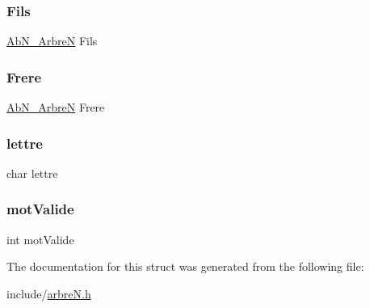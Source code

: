 \subsubsection{\texorpdfstring{Fils}{Fils}}
{\footnotesize\ttfamily \hyperlink{arbre_n_8h_add8f6e03bc4360adaf4735b01c864d18}{Ab\+N\+\_\+\+ArbreN} Fils}

\mbox{\label{struct_ab_n___noeud_ab9f6c9e522d1192a2530d3fff9baa102}} 
\subsubsection{\texorpdfstring{Frere}{Frere}}
{\footnotesize\ttfamily \hyperlink{arbre_n_8h_add8f6e03bc4360adaf4735b01c864d18}{Ab\+N\+\_\+\+ArbreN} Frere}

\mbox{\label{struct_ab_n___noeud_a1fd1cee5d78e1f4af4a8fe512320ef95}} 
\subsubsection{\texorpdfstring{lettre}{lettre}}
{\footnotesize\ttfamily char lettre}

\mbox{\label{struct_ab_n___noeud_a633ebb76d03647ae3e74e6206bae1ca5}} 
\subsubsection{\texorpdfstring{mot\+Valide}{motValide}}
{\footnotesize\ttfamily int mot\+Valide}



The documentation for this struct was generated from the following file\+:\begin{DoxyCompactItemize}
\item 
include/\hyperlink{arbre_n_8h}{arbre\+N.\+h}\end{DoxyCompactItemize}
